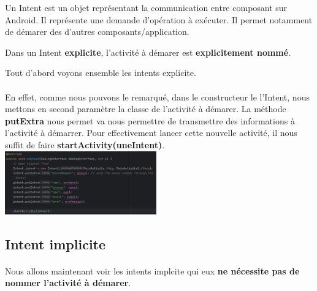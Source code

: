 \documentclass[a4paper]{article}
\begin{document}
\begin{multicols}{2}
      Un Intent est un objet représentant la communication entre composant sur Android. Il représente une demande d'opération à exécuter. Il permet notamment de démarer des d'autres composants/application.

      Dans un Intent \textbf{explicite}, l'activité à démarer est \textbf{explicitement nommé}. 

      Tout d'abord voyons ensemble les intents explicite.
    \paragraph{}
      En effet, comme nous pouvons le remarqué, dans le constructeur le l'Intent, nous mettons en second paramètre la classe de l'activité à démarer. La méthode \textbf{putExtra} nous permet va nous permettre de transmettre des informations à l'activité à démarrer. Pour effectivement lancer cette nouvelle activité, il nous suffit de faire \textbf{startActivity(uneIntent)}.
      \includegraphics[width=0.49\textwidth]{explicit/implementation}
    \subsection{Intent implicite}
      \paragraph{}
        Nous allons maintenant voir les intents implcite qui eux \textbf{ne nécessite pas de nommer l'activité à démarer}.

\end{multicols}
\end{document}
